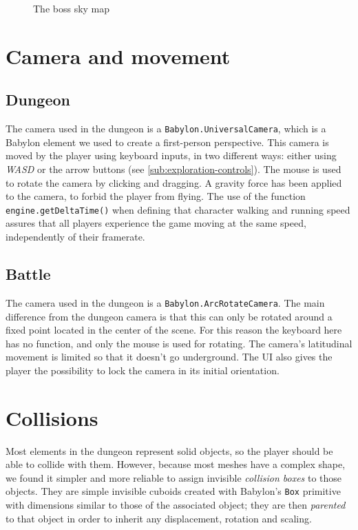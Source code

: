 \begin{figure}[H]
    \centering
    \caption{The boss sky map}
\end{figure}

\section{Camera and movement}

\subsection{Dungeon}

The camera used in the dungeon is a \texttt{Babylon.UniversalCamera}, which is a Babylon element we used to create a first-person perspective.
This camera is moved by the player using keyboard inputs, in two different ways: either using \textit{WASD} or the arrow buttons (see \autoref{sub:exploration-controls}).
The mouse is used to rotate the camera by clicking and dragging.
A gravity force has been applied to the camera, to forbid the player from flying.
The use of the function \texttt{engine.getDeltaTime()} when defining that character walking and running speed assures that all players experience the game moving at the same speed, independently of their framerate.

\subsection{Battle}
The camera used in the dungeon is a \texttt{Babylon.ArcRotateCamera}. The main difference from the dungeon camera is that this can only be rotated around a fixed point located in the center of the scene.
For this reason the keyboard here has no function, and only the mouse is used for rotating.
The camera's latitudinal movement is limited so that it doesn't go underground.
The UI also gives the player the possibility to lock the camera in its initial orientation.

\section{Collisions}
Most elements in the dungeon represent solid objects, so the player should be able to collide with them. However, because most meshes have a complex shape, we found it simpler and more reliable to assign invisible \textit{collision boxes} to those objects. They are simple invisible cuboids created with Babylon's \texttt{Box} primitive with dimensions similar to those of the associated object; they are then \textit{parented} to that object in order to inherit any displacement, rotation and scaling.

